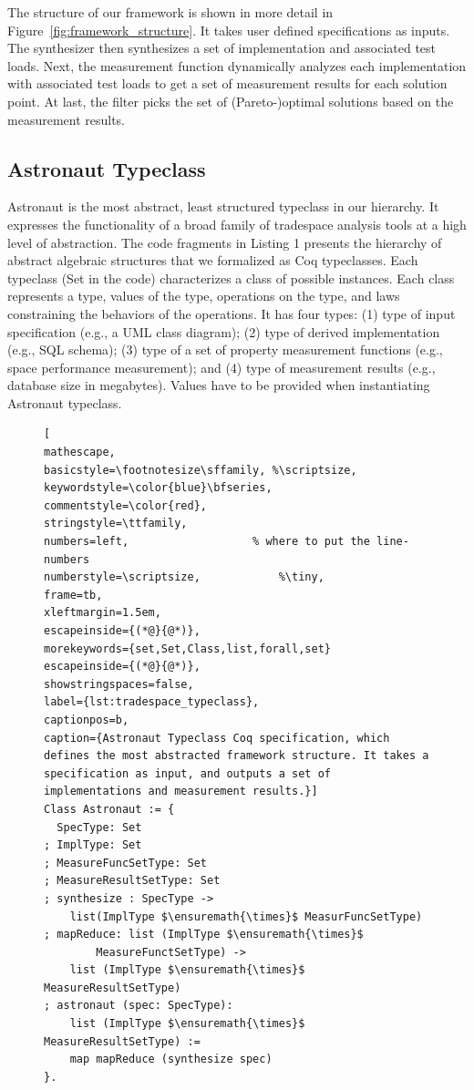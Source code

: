 \documentclass{sig-alternate}
\begin{document}
The structure of our framework is shown in more detail in Figure~\ref{fig:framework_structure}. It takes user defined specifications as inputs. The synthesizer then synthesizes a set of implementation and associated test loads. Next, the measurement function dynamically analyzes each implementation with associated test loads to get a set of measurement results for each solution point. At last, the filter picks the set of (Pareto-)optimal solutions based on the measurement results.


\subsection{Astronaut Typeclass}
Astronaut is the most abstract, least structured typeclass in our hierarchy. It expresses the functionality of a broad family of tradespace analysis tools at a high level of abstraction. The code fragments in Listing 1 presents the hierarchy of abstract algebraic structures that we formalized as Coq typeclasses. Each typeclass (\textsf{Set} in the code) characterizes a class of possible instances. Each class represents a type, values of the type, operations on the type, and laws constraining the behaviors of the operations. It has four types: (1) type of input specification (e.g., a UML class diagram); (2) type of derived implementation (e.g., SQL schema); (3) type of a set of property measurement functions (e.g., space performance measurement); and (4) type of measurement results (e.g., database size in megabytes). Values have to be provided when instantiating Astronaut typeclass. %

\begin{figure}
\vspace{1cm}
\begin{lstlisting}[
mathescape,
basicstyle=\footnotesize\sffamily, %\scriptsize,
keywordstyle=\color{blue}\bfseries,
commentstyle=\color{red},
stringstyle=\ttfamily,
numbers=left,					% where to put the line-numbers
numberstyle=\scriptsize,			%\tiny,      
frame=tb,
xleftmargin=1.5em,
escapeinside={(*@}{@*)},	
morekeywords={set,Set,Class,list,forall,set}
escapeinside={(*@}{@*)},
showstringspaces=false,
label={lst:tradespace_typeclass},
captionpos=b,
caption={Astronaut Typeclass Coq specification, which defines the most abstracted framework structure. It takes a specification as input, and outputs a set of implementations and measurement results.}]
Class Astronaut := {
  SpecType: Set
; ImplType: Set
; MeasureFuncSetType: Set
; MeasureResultSetType: Set
; synthesize : SpecType ->
    list(ImplType $\ensuremath{\times}$ MeasurFuncSetType)
; mapReduce: list (ImplType $\ensuremath{\times}$
    	MeasureFunctSetType) ->
    list (ImplType $\ensuremath{\times}$ MeasureResultSetType)
; astronaut (spec: SpecType):
    list (ImplType $\ensuremath{\times}$ MeasureResultSetType) :=
    map mapReduce (synthesize spec)
}.
\end{lstlisting}
 \end{figure}
\end{document}
